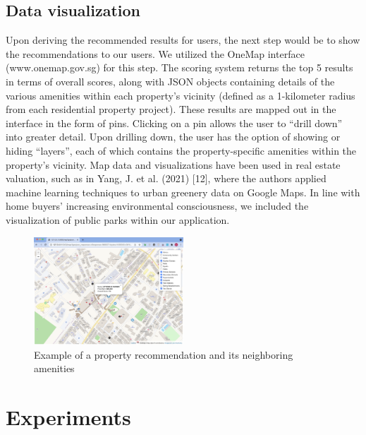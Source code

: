 \documentclass[a4paper, 11pt]{article}
\begin{document}
\subsection{Data visualization}

Upon deriving the recommended results for users, the next step would be to show the recommendations to our users. We utilized the OneMap interface (www.onemap.gov.sg) for this step. The scoring system returns the top 5 results in terms of overall scores, along with JSON objects containing details of the various amenities within each property's vicinity (defined as a 1-kilometer radius from each residential property project). These results are mapped out in the interface in the form of pins. Clicking on a pin allows the user to “drill down” into greater detail. Upon drilling down, the user has the option of showing or hiding “layers”, each of which contains the property-specific amenities within the property's vicinity. Map data and visualizations have been used in real estate valuation, such as in Yang, J. et al. (2021) [12], where the authors applied machine learning techniques to urban greenery data on Google Maps. In line with home buyers’ increasing environmental consciousness, we included the visualization of public parks within our application.

   \begin{figure}[h]
   \centering
   \includegraphics[width={0.5\textwidth}]{map.png}
   \caption{Example of a property recommendation and its neighboring amenities}
   \end{figure}

\section{Experiments}
\end{document}
